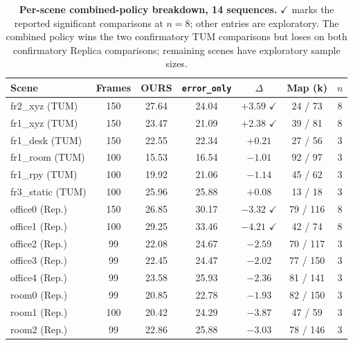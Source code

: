 \documentclass[10pt,twocolumn,letterpaper]{article}
\begin{document}
\begin{table}[t]
\centering
\small
\begin{tabular}{lcccccc}
\toprule
\textbf{Scene} & \textbf{Frames} & \textbf{OURS} & \textbf{\texttt{error\_only}} & \textbf{$\Delta$} & \textbf{Map (k)} & \textbf{$n$} \\
\midrule
fr2\_xyz (TUM) & 150 & 27.64 & 24.04 & $+3.59$ $\checkmark$ & 24 / 73 & 8 \\
fr1\_xyz (TUM) & 150 & 23.47 & 21.09 & $+2.38$ $\checkmark$ & 39 / 81 & 8 \\
fr1\_desk (TUM) & 150 & 22.55 & 22.34 & $+0.21$ & 27 / 56 & 3 \\
fr1\_room (TUM) & 100 & 15.53 & 16.54 & $-1.01$ & 92 / 97 & 3 \\
fr1\_rpy (TUM) & 100 & 19.92 & 21.06 & $-1.14$ & 45 / 62 & 3 \\
fr3\_static (TUM) & 100 & 25.96 & 25.88 & $+0.08$ & 13 / 18 & 3 \\
office0 (Rep.) & 150 & 26.85 & 30.17 & $-3.32$ $\checkmark$ & 79 / 116 & 8 \\
office1 (Rep.) & 100 & 29.25 & 33.46 & $-4.21$ $\checkmark$ & 42 / 74 & 8 \\
office2 (Rep.) & 99 & 22.08 & 24.67 & $-2.59$ & 70 / 117 & 3 \\
office3 (Rep.) & 99 & 22.45 & 24.47 & $-2.02$ & 77 / 150 & 3 \\
office4 (Rep.) & 99 & 23.58 & 25.93 & $-2.36$ & 81 / 141 & 3 \\
room0 (Rep.) & 99 & 20.85 & 22.78 & $-1.93$ & 82 / 150 & 3 \\
room1 (Rep.) & 100 & 20.42 & 24.29 & $-3.87$ & 47 / 59 & 3 \\
room2 (Rep.) & 99 & 22.86 & 25.88 & $-3.03$ & 78 / 146 & 3 \\
\bottomrule
\end{tabular}
\caption{\textbf{Per-scene combined-policy breakdown, 14 sequences.} $\checkmark$ marks the reported significant comparisons at $n=8$; other entries are exploratory. The combined policy wins the two confirmatory TUM comparisons but loses on both confirmatory Replica comparisons; remaining scenes have exploratory sample sizes.}
\label{tab:scenes}
\end{table}
\end{document}
